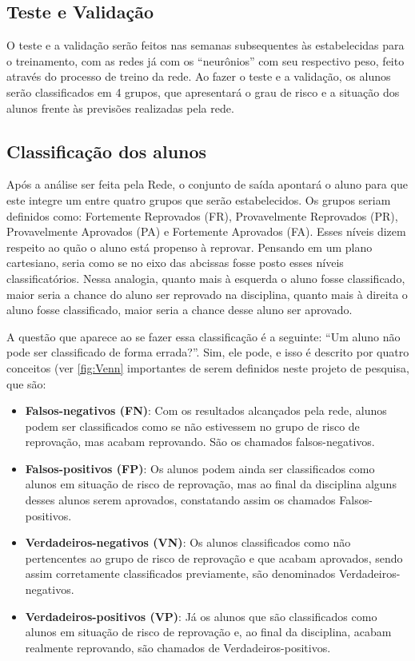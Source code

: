 \documentclass[
	12pt,				%
	openright,			%
	oneside,
	a4paper,			%
	english,			%
	french,				%
	spanish,			%
	brazil,				%
	]{abntex2}
\begin{document}
\subsection{Teste e Validação}

O teste e a validação serão feitos nas semanas subsequentes às estabelecidas para o treinamento, com as redes já com os ``neurônios'' com seu respectivo peso, feito através do processo de treino da rede. Ao fazer o teste e a validação, os alunos serão classificados em 4 grupos, que apresentará o grau de risco e a situação dos alunos frente às previsões realizadas pela rede.

\subsection{Classificação dos alunos}
Após a análise ser feita pela Rede, o conjunto de saída apontará o aluno para que este integre um entre quatro grupos que serão estabelecidos. Os grupos seriam definidos como: Fortemente Reprovados (FR), Provavelmente Reprovados (PR), Provavelmente Aprovados (PA) e Fortemente Aprovados (FA). Esses níveis dizem respeito ao quão o aluno está propenso à reprovar. Pensando em um plano cartesiano, seria como se no eixo das abcissas fosse posto esses níveis classificatórios. Nessa analogia, quanto mais à esquerda o aluno fosse classificado, maior seria a chance do aluno ser reprovado na disciplina, quanto mais à direita o aluno fosse classificado, maior seria a chance desse aluno ser aprovado.

A questão que aparece ao se fazer essa classificação é a seguinte: ``Um aluno não pode ser classificado de forma errada?''. Sim, ele pode, e isso é descrito por quatro conceitos (ver \autoref{fig:Venn} importantes de serem definidos neste projeto de pesquisa, que são:

\begin{itemize}
    \item \textbf{Falsos-negativos (FN)}: Com os resultados alcançados pela rede, alunos podem ser classificados como se não estivessem no grupo de risco de reprovação, mas acabam reprovando. São os chamados falsos-negativos.
    \item \textbf{Falsos-positivos (FP)}: Os alunos podem ainda ser classificados como alunos em situação de risco de reprovação, mas ao final da disciplina alguns desses alunos serem aprovados, constatando assim os chamados Falsos-positivos.
    \item \textbf{Verdadeiros-negativos (VN)}: Os alunos classificados como não pertencentes ao grupo de risco de reprovação e que acabam aprovados, sendo assim corretamente classificados previamente, são denominados Verdadeiros-negativos.
    \item \textbf{Verdadeiros-positivos (VP)}: Já os alunos que são classificados como alunos em situação de risco de reprovação e, ao final da disciplina, acabam realmente reprovando, são chamados de Verdadeiros-positivos.
\end{itemize}
\end{document}
